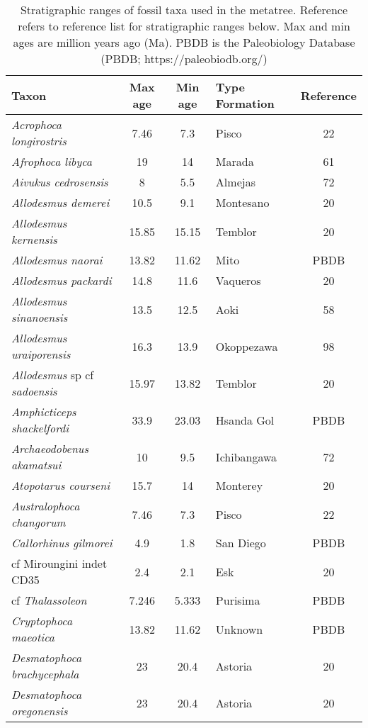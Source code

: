 \begin{longtable}{p{}cclc}

\caption{Stratigraphic ranges of fossil taxa used in the metatree. Reference refers to reference list for stratigraphic ranges below. Max and min ages are million years ago (Ma). PBDB is the Paleobiology Database (PBDB; https://paleobiodb.org/)}\\

\hline
\textbf{Taxon} & \textbf{Max age} & \textbf{Min age} & \textbf{Type Formation} & \textbf{Reference}\\
\hline
\textit{Acrophoca longirostris} & 	7.46	&	7.3	&	Pisco	&22\\
\textit{Afrophoca libyca} & 	19	&	14	&	Marada	& 61\\
\textit{Aivukus cedrosensis} & 	8	&	5.5	&	Almejas	&72\\
\textit{Allodesmus demerei} & 	10.5	&	9.1	&	Montesano	&20\\
\textit{Allodesmus kernensis} & 	15.85	&	15.15	&	Temblor	&20\\
\textit{Allodesmus naorai} & 	13.82	&	11.62	&	Mito	&PBDB\\
\textit{Allodesmus packardi} & 	14.8	&	11.6	&	Vaqueros	&20\\
\textit{Allodesmus sinanoensis} & 	13.5	&	12.5	&	Aoki	&58\\
\textit{Allodesmus uraiporensis} & 	16.3	&	13.9	&	Okoppezawa	&98\\
\textit{Allodesmus} sp cf \textit{sadoensis} & 	15.97	&	13.82	&	Temblor	&20\\
\textit{Amphicticeps shackelfordi} & 	33.9	&	23.03	&	Hsanda Gol	&PBDB\\
\textit{Archaeodobenus akamatsui} & 	10	&	9.5	&	Ichibangawa	&72\\
\textit{Atopotarus courseni} & 	15.7	&	14	&	Monterey	&20\\
\textit{Australophoca changorum} & 	7.46	&	7.3	&	Pisco	&22\\
\textit{Callorhinus gilmorei} & 	4.9	&	1.8	&	San Diego	&PBDB\\
cf Miroungini indet CD35 & 	2.4	&	2.1	&	Esk	&20\\
cf \textit{Thalassoleon} & 	7.246	&	5.333	&	Purisima	&PBDB\\
\textit{Cryptophoca maeotica} & 	13.82	&	11.62	&	Unknown	&PBDB\\
\textit{Desmatophoca brachycephala} & 	23	&	20.4	&	Astoria	&20\\
\textit{Desmatophoca oregonensis} & 	23	&	20.4	&	Astoria	&20\\

\end{longtable}
